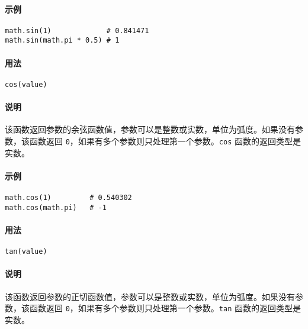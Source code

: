 \paragraph{示例}
\begin{lstlisting}[language=berry, numbers=none]
math.sin(1)             # 0.841471
math.sin(math.pi * 0.5) # 1
\end{lstlisting}


\paragraph{用法}
\begin{lstlisting}[language=berry, numbers=none]
cos(value)
\end{lstlisting}

\paragraph{说明}
该函数返回参数的余弦函数值，参数可以是整数或实数，单位为弧度。如果没有参数，该函数返回 \texttt{0}，如果有多个参数则只处理第一个参数。\texttt{cos} 函数的返回类型是实数。

\paragraph{示例}
\begin{lstlisting}[language=berry, numbers=none]
math.cos(1)         # 0.540302
math.cos(math.pi)   # -1
\end{lstlisting}


\paragraph{用法}
\begin{lstlisting}[language=berry, numbers=none]
tan(value)
\end{lstlisting}

\paragraph{说明}
该函数返回参数的正切函数值，参数可以是整数或实数，单位为弧度。如果没有参数，该函数返回 \texttt{0}，如果有多个参数则只处理第一个参数。\texttt{tan} 函数的返回类型是实数。


